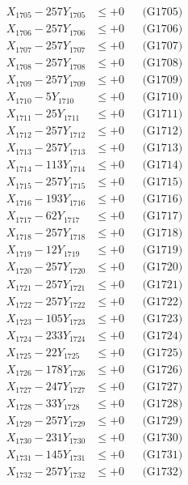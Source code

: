 \documentclass[a4paper,10pt]{article}
\begin{document}
{\begin{align}
X_{1705} - 257Y_{1705} &\leq +0 && \text{(G1705)} \\
X_{1706} - 257Y_{1706} &\leq +0 && \text{(G1706)} \\
X_{1707} - 257Y_{1707} &\leq +0 && \text{(G1707)} \\
X_{1708} - 257Y_{1708} &\leq +0 && \text{(G1708)} \\
X_{1709} - 257Y_{1709} &\leq +0 && \text{(G1709)} \\
X_{1710} - 5Y_{1710} &\leq +0 && \text{(G1710)} \\
\allowbreak
X_{1711} - 25Y_{1711} &\leq +0 && \text{(G1711)} \\
X_{1712} - 257Y_{1712} &\leq +0 && \text{(G1712)} \\
X_{1713} - 257Y_{1713} &\leq +0 && \text{(G1713)} \\
X_{1714} - 113Y_{1714} &\leq +0 && \text{(G1714)} \\
X_{1715} - 257Y_{1715} &\leq +0 && \text{(G1715)} \\
X_{1716} - 193Y_{1716} &\leq +0 && \text{(G1716)} \\
X_{1717} - 62Y_{1717} &\leq +0 && \text{(G1717)} \\
X_{1718} - 257Y_{1718} &\leq +0 && \text{(G1718)} \\
X_{1719} - 12Y_{1719} &\leq +0 && \text{(G1719)} \\
X_{1720} - 257Y_{1720} &\leq +0 && \text{(G1720)} \\
\allowbreak
X_{1721} - 257Y_{1721} &\leq +0 && \text{(G1721)} \\
X_{1722} - 257Y_{1722} &\leq +0 && \text{(G1722)} \\
X_{1723} - 105Y_{1723} &\leq +0 && \text{(G1723)} \\
X_{1724} - 233Y_{1724} &\leq +0 && \text{(G1724)} \\
X_{1725} - 22Y_{1725} &\leq +0 && \text{(G1725)} \\
X_{1726} - 178Y_{1726} &\leq +0 && \text{(G1726)} \\
X_{1727} - 247Y_{1727} &\leq +0 && \text{(G1727)} \\
X_{1728} - 33Y_{1728} &\leq +0 && \text{(G1728)} \\
X_{1729} - 257Y_{1729} &\leq +0 && \text{(G1729)} \\
X_{1730} - 231Y_{1730} &\leq +0 && \text{(G1730)} \\
\allowbreak
X_{1731} - 145Y_{1731} &\leq +0 && \text{(G1731)} \\
X_{1732} - 257Y_{1732} &\leq +0 && \text{(G1732)} \\

\end{align}}
\end{document}
